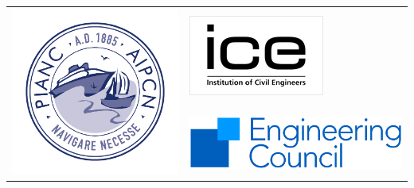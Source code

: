 
\begin{table}[ht]
\centering
\begin{tabular}{m{} m{}}

\multirow{2}{*}{\includegraphics[width = 0.9\linewidth]{Figures/pianc.jpg}} & \includegraphics[width = 0.65\linewidth]{Figures/ice2.jpg} \\
& \includegraphics[width = 0.8\linewidth]{Figures/council.jpg} \\

\end{tabular}
\end{table}
        
